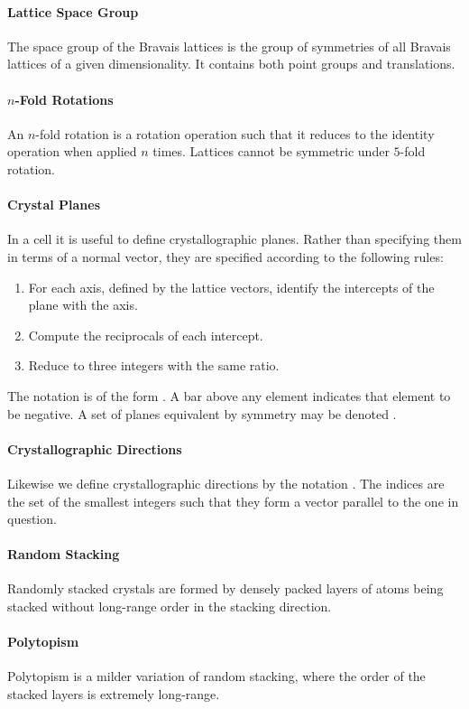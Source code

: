 \paragraph{Lattice Space Group}
The space group of the Bravais lattices is the group of symmetries of all Bravais lattices of a given dimensionality. It contains both point groups and translations.

\paragraph{$n$-Fold Rotations}
An $n$-fold rotation is a rotation operation such that it reduces to the identity operation when applied $n$ times. Lattices cannot be symmetric under $5$-fold rotation.

\paragraph{Crystal Planes}
In a cell it is useful to define crystallographic planes. Rather than specifying them in terms of a normal vector, they are specified according to the following rules:
\begin{enumerate}
	\item For each axis, defined by the lattice vectors, identify the intercepts of the plane with the axis.
	\item Compute the reciprocals of each intercept.
	\item Reduce to three integers with the same ratio.
\end{enumerate}
The notation is of the form . A bar above any element indicates that element to be negative. A set of planes equivalent by symmetry may be denoted .

\paragraph{Crystallographic Directions}
Likewise we define crystallographic directions by the notation . The indices are the set of the smallest integers such that they form a vector parallel to the one in question.

\paragraph{Random Stacking}
Randomly stacked crystals are formed by densely packed layers of atoms being stacked without long-range order in the stacking direction.

\paragraph{Polytopism}
Polytopism is a milder variation of random stacking, where the order of the stacked layers is extremely long-range.

